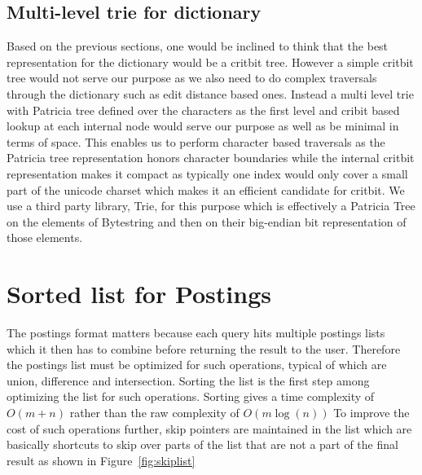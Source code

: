 \subsection{Multi-level trie for dictionary}
Based on the previous sections, one would be inclined to think that the best representation for the dictionary would be a critbit tree.
However a simple critbit tree would not serve our purpose as we also need to do complex traversals through the dictionary such as edit distance based ones.
Instead a multi level trie with Patricia tree defined over the characters as the first level and cribit based lookup at each internal node
would serve our purpose as well as be minimal in terms of space.
This enables us to perform character based traversals as the Patricia tree representation honors character boundaries
while the internal critbit representation makes it compact as typically one index would only cover a small part of the unicode charset which makes it
an efficient candidate for critbit.
We use a third party library, Trie\cite{bytestringTrie}, for this purpose which is effectively a Patricia Tree on the elements of Bytestring and then on their big-endian
bit representation of those elements.

\section{Sorted list for Postings}
The postings format matters because each query hits multiple postings lists which it then has to combine before returning the result to the user.
Therefore the postings list must be optimized for such operations, typical of which are union, difference and intersection.
Sorting the list is the first step among optimizing the list for such operations.
Sorting gives a time complexity of $O(m+n)$ rather than the raw complexity of $O(m \log(n))$
To improve the cost of such operations further, skip pointers are maintained in the list which are basically shortcuts to skip over parts of the list
that are not a part of the final result as shown in Figure~\ref{fig:skiplist}

